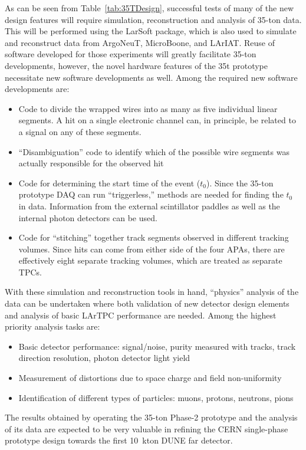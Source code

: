 As can be seen from Table~\ref{tab:35TDesign}, successful tests of many of the new
design features will require simulation, reconstruction and analysis of 35-ton data.
This will be performed using the LarSoft package, which is also used to simulate and
reconstruct data from ArgoNeuT, MicroBoone, and LArIAT.
Reuse of software developed for those experiments will greatly facilitate 35-ton developments,
however, the novel hardware features of the 35t prototype necessitate new software developments
as well.
Among the required new software developments are:
\begin{itemize}
\item{Code to divide the wrapped wires into as many as five individual linear segments.
A hit on a single electronic channel can, in principle, be related to a
signal on any of these segments.}
\item{``Disambiguation'' code to identify which of the possible wire segments was actually responsible
for the observed hit}
\item{Code for determining the start time of the event ($t_0$). Since the 35-ton prototype DAQ can
run ``triggerless,'' methods are needed for finding the $t_0$ in data. Information from the external
scintillator paddles as well as the internal photon detectors can be used.}
\item{Code for ``stitching'' together track segments observed in different tracking volumes.
Since hits can come from either side of the four APAs, there are
effectively eight separate tracking volumes,
which are treated as separate TPCs.}
\end{itemize}

With these simulation and reconstruction tools in hand, ``physics'' analysis of the data can be undertaken where
both validation of new detector design elements and analysis of basic LArTPC performance are needed.
Among the highest priority analysis tasks are:

\begin{itemize}
\item{Basic detector performance: signal/noise, purity measured with tracks, track direction resolution,
photon detector light yield}
\item{Measurement of distortions due to space charge and field non-uniformity}
\item{Identification of different types of particles: muons, protons, neutrons, pions}
\end{itemize}

The results obtained by operating the 35-ton Phase-2 prototype and the analysis of its data are expected
to be very valuable in refining the CERN single-phase prototype design towards the first 10~kton DUNE far detector.
